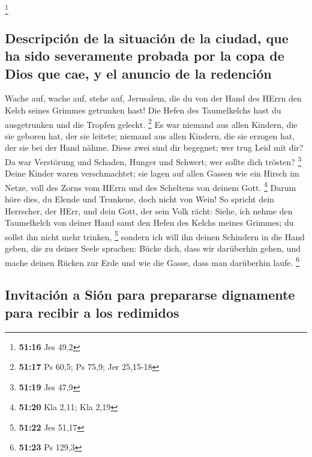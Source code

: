 \footnote{\textbf{51:16} Jes 49,2}

\hypertarget{descripciuxf3n-de-la-situaciuxf3n-de-la-ciudad-que-ha-sido-severamente-probada-por-la-copa-de-dios-que-cae-y-el-anuncio-de-la-redenciuxf3n}{%
\subsection{Descripción de la situación de la ciudad, que ha sido
severamente probada por la copa de Dios que cae, y el anuncio de la
redención}\label{descripciuxf3n-de-la-situaciuxf3n-de-la-ciudad-que-ha-sido-severamente-probada-por-la-copa-de-dios-que-cae-y-el-anuncio-de-la-redenciuxf3n}}

 Wache auf, wache auf, stehe auf, Jerusalem, die du von
der Hand des HErrn den Kelch seines Grimmes getrunken hast! Die Hefen
des Taumelkelchs hast du ausgetrunken und die Tropfen geleckt.
\footnote{\textbf{51:17} Ps 60,5; Ps 75,9; Jer 25,15-18} 
Es war niemand aus allen Kindern, die sie geboren hat, der sie leitete;
niemand aus allen Kindern, die sie erzogen hat, der sie bei der Hand
nähme.  Diese zwei sind dir begegnet; wer trug Leid mit
dir? Da war Verstörung und Schaden, Hunger und Schwert; wer sollte dich
trösten? \footnote{\textbf{51:19} Jes 47,9}  Deine Kinder
waren verschmachtet; sie lagen auf allen Gassen wie ein Hirsch im Netze,
voll des Zorns vom HErrn und des Scheltens von deinem Gott. \footnote{\textbf{51:20}
  Kla 2,11; Kla 2,19}  Darum höre dies, du Elende und
Trunkene, doch nicht von Wein!  So spricht dein
Herrscher, der HErr, und dein Gott, der sein Volk rächt: Siehe, ich
nehme den Taumelkelch von deiner Hand samt den Hefen des Kelchs meines
Grimmes; du sollst ihn nicht mehr trinken, \footnote{\textbf{51:22} Jes
  51,17}  sondern ich will ihn deinen Schindern in die
Hand geben, die zu deiner Seele sprachen: Bücke dich, dass wir
darüberhin gehen, und mache deinen Rücken zur Erde und wie die Gasse,
dass man darüberhin laufe. \footnote{\textbf{51:23} Ps 129,3}

\hypertarget{invitaciuxf3n-a-siuxf3n-para-prepararse-dignamente-para-recibir-a-los-redimidos}{%
\subsection{Invitación a Sión para prepararse dignamente para recibir a
los
redimidos}\label{invitaciuxf3n-a-siuxf3n-para-prepararse-dignamente-para-recibir-a-los-redimidos}}


